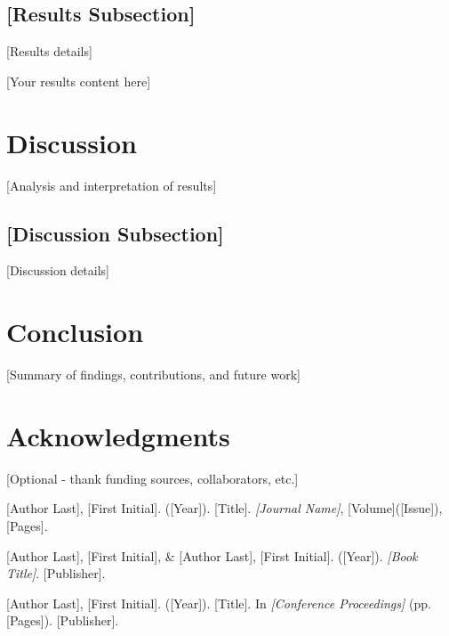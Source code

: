 \documentclass[12pt,a4paper]{article}
\begin{document}
\subsection{[Results Subsection]}
[Results details]

[Your results content here]

\section{Discussion}
[Analysis and interpretation of results]

\subsection{[Discussion Subsection]}
[Discussion details]

\section{Conclusion}
[Summary of findings, contributions, and future work]

\section*{Acknowledgments}
[Optional - thank funding sources, collaborators, etc.]


\begin{thebibliography}{99}

[Author Last], [First Initial]. ([Year]). [Title]. \emph{[Journal Name]}, [Volume]([Issue]), [Pages].

[Author Last], [First Initial], \& [Author Last], [First Initial]. ([Year]). \emph{[Book Title]}. [Publisher].

[Author Last], [First Initial]. ([Year]). [Title]. In \emph{[Conference Proceedings]} (pp. [Pages]). [Publisher].

\end{thebibliography}
\end{document}
